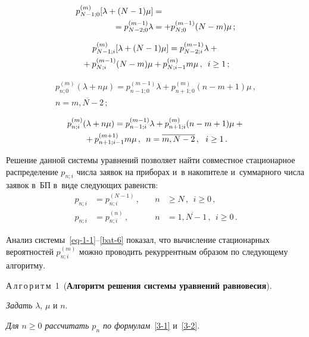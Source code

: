 \begin{multicols}{2}
\noindent
\begin{align}
p^{(m)}_{N-1;0} [\lambda+(N-1)\mu] &={}\notag\\
{}=p^{(m-1)}_{N-2;0} \lambda
&{}=+ p^{(m-1)}_{N;0} (N-m) \mu \,;
\label{bat-3}
\end{align}

\noindent
\begin{multline}
p^{(m)}_{N-1;i} [\lambda+(N-1)\mu] =p^{(m-1)}_{N-2;i} \lambda+{}\\
{}+
p^{(m-1)}_{N;i} (N-m) \mu +p^{(m)}_{N;i-1} m \mu\,,\enskip i\ge 1\,;
\label{bat-4}
\end{multline}

\vspace*{-12pt}



\noindent
\begin{multline}
\label{bat-5}
p^{(m)}_{n;0} (\lambda+n\mu) = p^{(m-1)}_{n-1;0} \lambda+
p^{(m)}_{n+1;0} (n-m+1) \mu \,,\\
 n=\overline{m,N-2}\,;
\end{multline}

\noindent
\begin{multline}
\label{bat-6}
p^{(m)}_{n;i} (\lambda+n\mu) = p^{(m-1)}_{n-1;i} \lambda
+
p^{(m)}_{n+1;i} (n-m+1) \mu +{}\\
{}+ p^{(m+1)}_{n+1;i-1} m \mu\,,\enskip
 n=\overline{m,N-2}\,,\ \ i\ge 1\,.
\end{multline}

Решение данной системы уравнений позволяет
найти совместное стационарное распределение
$p_{n;i}$ числа заявок на приборах и~в
накопителе и~суммарного числа заявок в~БП в~виде следующих ра\-венств:
\begin{alignat*}{2}
p_{n;i} &= p^{(N-1)}_{n;i}\,, &\quad  n&\ge N\,,\ \ i\ge 0\,,
\\
p_{n;i} &= p^{(n)}_{n;i} \,, &\quad n&=\overline{1,N-1}\,,\ \ i\ge 0\,.
\end{alignat*}

Анализ системы~\eqref{eq-1-1}--\eqref{bat-6}
показал, что вычисление стационарных
вероятностей $p^{(m)}_{n;i}$ можно проводить
рекуррентным образом по следующему алгоритму.

\bigskip

\noindent
А\,л\,г\,о\,р\,и\,т\,м~1\ (\textbf{Алгоритм решения системы уравнений равновесия}).

\noindent
\textit{Задать} $\lambda$, $\mu$ и $n$.

\noindent
\textit{Для $n\ge 0$ рассчитать $p_{n}$ по
формулам}~\eqref{3-1} и~\eqref{3-2}.


\end{multicols}
